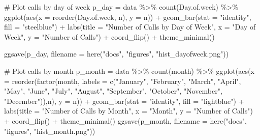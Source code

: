 \documentclass[
  letterpaper,
  DIV=11,
  numbers=noendperiod]{scrartcl}
\newenvironment{Shaded}{\begin{snugshade}}{\end{snugshade}}
\newcommand{\AttributeTok}[1]{\textcolor[rgb]{0.40,0.45,0.13}{#1}}
\newcommand{\CommentTok}[1]{\textcolor[rgb]{0.37,0.37,0.37}{#1}}
\newcommand{\FunctionTok}[1]{\textcolor[rgb]{0.28,0.35,0.67}{#1}}
\newcommand{\NormalTok}[1]{\textcolor[rgb]{0.00,0.23,0.31}{#1}}
\newcommand{\OtherTok}[1]{\textcolor[rgb]{0.00,0.23,0.31}{#1}}
\newcommand{\SpecialCharTok}[1]{\textcolor[rgb]{0.37,0.37,0.37}{#1}}
\newcommand{\StringTok}[1]{\textcolor[rgb]{0.13,0.47,0.30}{#1}}
\begin{document}
\begin{Shaded}
\begin{Highlighting}[]
\CommentTok{\# Plot calls by day of week}
\NormalTok{p\_day }\OtherTok{=}\NormalTok{ data }\SpecialCharTok{\%\textgreater{}\%}
  \FunctionTok{count}\NormalTok{(Day.of.week) }\SpecialCharTok{\%\textgreater{}\%}
  \FunctionTok{ggplot}\NormalTok{(}\FunctionTok{aes}\NormalTok{(}\AttributeTok{x =} \FunctionTok{reorder}\NormalTok{(Day.of.week, n), }\AttributeTok{y =}\NormalTok{ n)) }\SpecialCharTok{+}
  \FunctionTok{geom\_bar}\NormalTok{(}\AttributeTok{stat =} \StringTok{"identity"}\NormalTok{, }\AttributeTok{fill =} \StringTok{"steelblue"}\NormalTok{) }\SpecialCharTok{+}
  \FunctionTok{labs}\NormalTok{(}\AttributeTok{title =} \StringTok{"Number of Calls by Day of Week"}\NormalTok{, }
       \AttributeTok{x =} \StringTok{"Day of Week"}\NormalTok{, }\AttributeTok{y =} \StringTok{"Number of Calls"}\NormalTok{) }\SpecialCharTok{+}
  \FunctionTok{coord\_flip}\NormalTok{() }\SpecialCharTok{+} \FunctionTok{theme\_minimal}\NormalTok{()}

\FunctionTok{ggsave}\NormalTok{(p\_day, }\AttributeTok{filename =} \FunctionTok{here}\NormalTok{(}\StringTok{"docs"}\NormalTok{, }\StringTok{"figures"}\NormalTok{, }\StringTok{"hist\_dayofweek.png"}\NormalTok{))}

\CommentTok{\# Plot calls by month}
\NormalTok{p\_month }\OtherTok{=}\NormalTok{ data }\SpecialCharTok{\%\textgreater{}\%}
  \FunctionTok{count}\NormalTok{(month) }\SpecialCharTok{\%\textgreater{}\%}
  \FunctionTok{ggplot}\NormalTok{(}\FunctionTok{aes}\NormalTok{(}\AttributeTok{x =} \FunctionTok{reorder}\NormalTok{(}\FunctionTok{factor}\NormalTok{(month, }\AttributeTok{labels =} \FunctionTok{c}\NormalTok{(}\StringTok{"January"}\NormalTok{, }\StringTok{"February"}\NormalTok{, }\StringTok{"March"}\NormalTok{,}
                                          \StringTok{"April"}\NormalTok{, }\StringTok{"May"}\NormalTok{, }\StringTok{"June"}\NormalTok{, }\StringTok{"July"}\NormalTok{, }\StringTok{"August"}\NormalTok{,}
                                          \StringTok{"September"}\NormalTok{, }\StringTok{"October"}\NormalTok{, }\StringTok{"November"}\NormalTok{, }
                                          \StringTok{"December"}\NormalTok{)),n), }\AttributeTok{y =}\NormalTok{ n)) }\SpecialCharTok{+}
  \FunctionTok{geom\_bar}\NormalTok{(}\AttributeTok{stat =} \StringTok{"identity"}\NormalTok{, }\AttributeTok{fill =} \StringTok{"lightblue"}\NormalTok{) }\SpecialCharTok{+}
  \FunctionTok{labs}\NormalTok{(}\AttributeTok{title =} \StringTok{"Number of Calls by Month"}\NormalTok{, }
       \AttributeTok{x =} \StringTok{"Month"}\NormalTok{, }\AttributeTok{y =} \StringTok{"Number of Calls"}\NormalTok{) }\SpecialCharTok{+}
  \FunctionTok{coord\_flip}\NormalTok{() }\SpecialCharTok{+} \FunctionTok{theme\_minimal}\NormalTok{()}
\FunctionTok{ggsave}\NormalTok{(p\_month, }\AttributeTok{filename =} \FunctionTok{here}\NormalTok{(}\StringTok{"docs"}\NormalTok{, }\StringTok{"figures"}\NormalTok{, }\StringTok{"hist\_month.png"}\NormalTok{))}


\end{Highlighting}
\end{Shaded}
\end{document}
